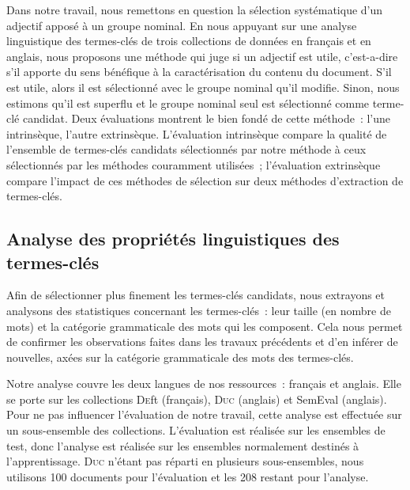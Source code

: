     Dans notre travail, nous remettons en question la sélection systématique
    d'un adjectif apposé à un groupe nominal. En nous appuyant sur une analyse
    linguistique des termes-clés de trois collections de données en français et
    en anglais, nous proposons une méthode qui juge si un adjectif est utile,
    c'est-a-dire s'il apporte du sens bénéfique à la caractérisation du contenu
    du document. S'il est utile, alors il est sélectionné avec le groupe nominal
    qu'il modifie. Sinon, nous estimons qu'il est superflu et le groupe nominal
    seul est sélectionné comme terme-clé candidat.
    Deux évaluations montrent le bien fondé de cette méthode~: l'une
    intrinsèque, l'autre extrinsèque. L'évaluation intrinsèque compare la
    qualité de l'ensemble de termes-clés candidats sélectionnés par notre
    méthode à ceux sélectionnés par les méthodes couramment utilisées~;
    l'évaluation extrinsèque compare l'impact de ces méthodes de sélection sur
    deux méthodes d'extraction de termes-clés.

    \subsection{Analyse des propriétés linguistiques des termes-clés}
    \label{subsec:main:domain_independent_keyphrase_extraction-keyphrase_candidate_selection-analysis_of_keyphrase_properties}
      Afin de sélectionner plus finement les termes-clés candidats, nous
      extrayons et analysons des statistiques concernant les termes-clés~: leur
      taille (en nombre de mots) et la catégorie grammaticale des mots qui les
      composent. Cela nous permet de confirmer les observations faites dans les
      travaux précédents et d'en inférer de nouvelles, axées sur la catégorie
      grammaticale des mots des termes-clés.

      Notre analyse couvre les deux langues de nos ressources~: français et
      anglais. Elle se porte sur les collections \textsc{De}ft (français),
      \textsc{Duc} (anglais) et SemEval (anglais). Pour ne pas influencer
      l'évaluation de notre travail, cette analyse est effectuée sur un
      sous-ensemble des collections. L'évaluation est réalisée sur les ensembles
      de test, donc l'analyse est réalisée sur les ensembles normalement
      destinés à l'apprentissage. \textsc{Duc} n'étant pas réparti en plusieurs
      sous-ensembles, nous utilisons 100 documents pour l'évaluation et les 208
      restant pour l'analyse.

